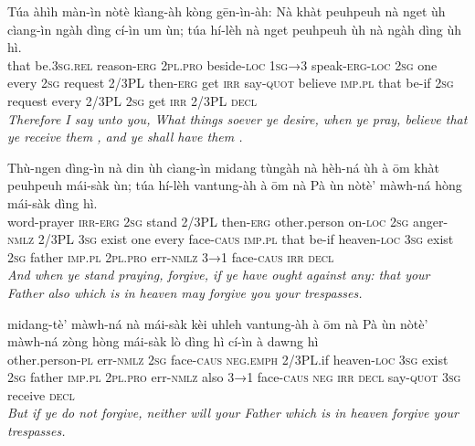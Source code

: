 \documentclass[11pt,a4paper]{article}
\begin{document}
\begin{exe}
\gll Túa àhìh màn-ìn nòtè kìang-àh kòng gēn-ìn-àh: Nà khàt peuhpeuh nà nget ùh cìang-ìn ngàh dìng cí-ìn um ùn; túa hí-lèh nà nget peuhpeuh ùh nà ngàh dìng ùh hì. \\
     that be.\textsc{3sg}.\textsc{rel} reason-\textsc{erg} \textsc{2pl}.\textsc{pro} beside-\textsc{loc} \textsc{1sg→3} speak-\textsc{erg}-\textsc{loc} \textsc{2sg} one every \textsc{2sg} request 2/3PL then-\textsc{erg} get \textsc{irr} say-\textsc{quot} believe \textsc{imp}.\textsc{pl} that be-if \textsc{2sg} request every 2/3PL \textsc{2sg} get \textsc{irr} 2/3PL \textsc{decl} \\
\glt \textcolor{kjvcolor}{\textit{Therefore I say unto you, What things soever ye desire, when ye pray, believe that ye receive them , and ye shall have them .}}

\gll Thù-ngen dìng-ìn nà din ùh cìang-ìn midang tùngàh nà hèh-ná ùh à ōm khàt peuhpeuh mái-sàk ùn; túa hí-lèh vantung-àh à ōm nà Pà ùn nòtè' màwh-ná hòng mái-sàk dìng hì. \\
     word-prayer \textsc{irr}-\textsc{erg} \textsc{2sg} stand 2/3PL then-\textsc{erg} other.person on-\textsc{loc} \textsc{2sg} anger-\textsc{nmlz} 2/3PL \textsc{3sg} exist one every face-\textsc{caus} \textsc{imp}.\textsc{pl} that be-if heaven-\textsc{loc} \textsc{3sg} exist \textsc{2sg} father \textsc{imp}.\textsc{pl} \textsc{2pl}.\textsc{pro} err-\textsc{nmlz} \textsc{3→1} face-\textsc{caus} \textsc{irr} \textsc{decl} \\
\glt \textcolor{kjvcolor}{\textit{And when ye stand praying, forgive, if ye have ought against any: that your Father also which is in heaven may forgive you your trespasses.}}

\gll midang-tè' màwh-ná nà mái-sàk kèi uhleh vantung-àh à ōm nà Pà ùn nòtè' màwh-ná zòng hòng mái-sàk lò dìng hì cí-ìn à dawng hì \\
     other.person-\textsc{pl} err-\textsc{nmlz} \textsc{2sg} face-\textsc{caus} \textsc{neg}.\textsc{emph} 2/3PL.if heaven-\textsc{loc} \textsc{3sg} exist \textsc{2sg} father \textsc{imp}.\textsc{pl} \textsc{2pl}.\textsc{pro} err-\textsc{nmlz} also \textsc{3→1} face-\textsc{caus} \textsc{neg} \textsc{irr} \textsc{decl} say-\textsc{quot} \textsc{3sg} receive \textsc{decl} \\
\glt \textcolor{kjvcolor}{\textit{But if ye do not forgive, neither will your Father which is in heaven forgive your trespasses.}}


\end{exe}
\end{document}
